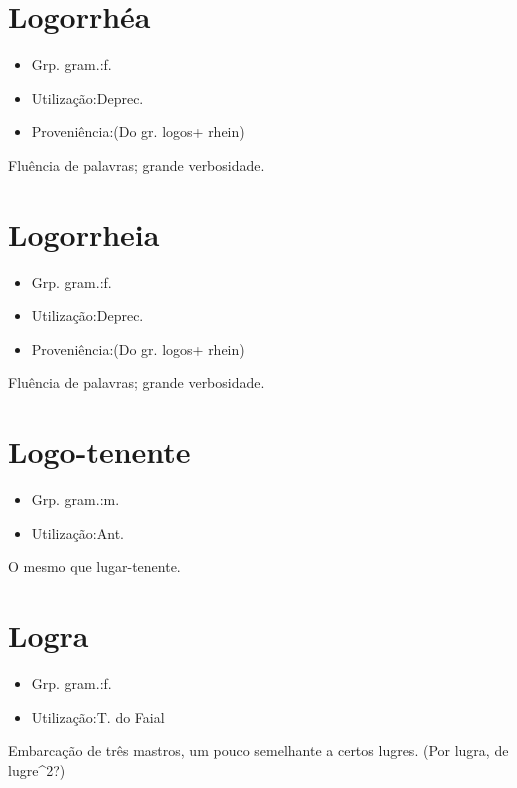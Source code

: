 \section{Logorrhéa}
\begin{itemize}
\item {Grp. gram.:f.}
\end{itemize}
\begin{itemize}
\item {Utilização:Deprec.}
\end{itemize}
\begin{itemize}
\item {Proveniência:(Do gr. \textunderscore logos\textunderscore  + \textunderscore rhein\textunderscore )}
\end{itemize}
Fluência de palavras; grande verbosidade.
\section{Logorrheia}
\begin{itemize}
\item {Grp. gram.:f.}
\end{itemize}
\begin{itemize}
\item {Utilização:Deprec.}
\end{itemize}
\begin{itemize}
\item {Proveniência:(Do gr. \textunderscore logos\textunderscore  + \textunderscore rhein\textunderscore )}
\end{itemize}
Fluência de palavras; grande verbosidade.
\section{Logo-tenente}
\begin{itemize}
\item {Grp. gram.:m.}
\end{itemize}
\begin{itemize}
\item {Utilização:Ant.}
\end{itemize}
O mesmo que \textunderscore lugar-tenente\textunderscore .
\section{Logra}
\begin{itemize}
\item {Grp. gram.:f.}
\end{itemize}
\begin{itemize}
\item {Utilização:T. do Faial}
\end{itemize}
Embarcação de três mastros, um pouco semelhante a certos lugres.
(Por \textunderscore lugra\textunderscore , de \textunderscore lugre\textunderscore ^2?)
